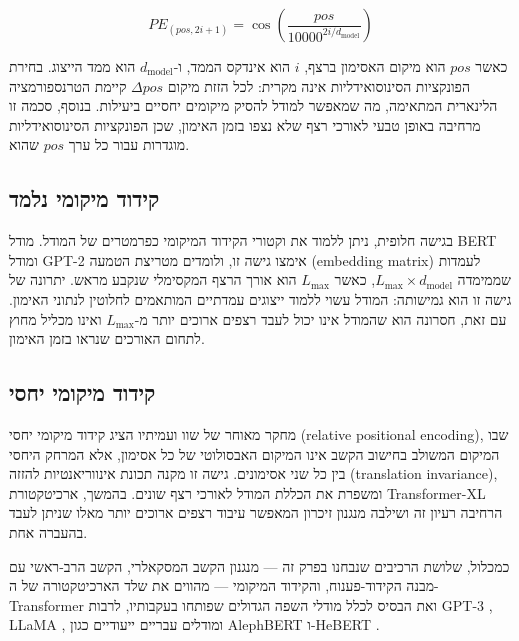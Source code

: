 \begin{equation}
  PE_{(pos, 2i+1)} = \cos\!\left(\frac{pos}{10000^{2i/d_{\text{model}}}}\right)
\end{equation}

כאשר \(pos\) הוא מיקום האסימון ברצף, \(i\) הוא אינדקס
הממד, ו-\(d_{\text{model}}\) הוא ממד הייצוג.
בחירת הפונקציות הסינוסואידליות אינה מקרית: לכל הזזת מיקום
\(\Delta pos\) קיימת הטרנספורמציה הלינארית המתאימה,
מה שמאפשר למודל להסיק מיקומים יחסיים ביעילות.
בנוסף, סכמה זו מרחיבה באופן טבעי לאורכי רצף שלא נצפו
בזמן האימון, שכן הפונקציות הסינוסואידליות מוגדרות עבור
כל ערך \(pos\) שהוא.

\subsection*{קידוד מיקומי נלמד}

בגישה חלופית, ניתן ללמוד את וקטורי הקידוד המיקומי
כפרמטרים של המודל.
מודל \textenglish{BERT} \cite{devlin2019bert} ומודל
\textenglish{GPT-2} \cite{radford2019language} אימצו גישה זו,
ולומדים מטריצת הטמעה (\textenglish{embedding matrix}) לעמדות
שממימדה \(L_{\max} \times d_{\text{model}}\), כאשר
\(L_{\max}\) הוא אורך הרצף המקסימלי שנקבע מראש.
יתרונה של גישה זו הוא גמישותה: המודל עשוי ללמוד ייצוגים
עמדתיים המותאמים לחלוטין לנתוני האימון.
עם זאת, חסרונה הוא שהמודל אינו יכול לעבד רצפים ארוכים
יותר מ-\(L_{\max}\) ואינו מכליל מחוץ לתחום האורכים שנראו
בזמן האימון.

\subsection*{קידוד מיקומי יחסי}

מחקר מאוחר של שוו ועמיתיו \cite{shaw2018relative} הציג
קידוד מיקומי יחסי (\textenglish{relative positional encoding}),
שבו המיקום המשולב בחישוב הקשב אינו המיקום האבסולוטי של
כל אסימון, אלא המרחק היחסי בין כל שני אסימונים.
גישה זו מקנה תכונת אינווריאנטיות להזזה (\textenglish{translation invariance}),
ומשפרת את הכללת המודל לאורכי רצף שונים.
בהמשך, ארכיטקטורת \textenglish{Transformer-XL} \cite{dai2019transformerxl}
הרחיבה רעיון זה ושילבה מנגנון זיכרון המאפשר עיבוד
רצפים ארוכים יותר מאלו שניתן לעבד בהעברה אחת.

כמכלול, שלושת הרכיבים שנבחנו בפרק זה — מנגנון הקשב
המסקאלרי, הקשב הרב-ראשי עם מבנה הקידוד-פענוח,
והקידוד המיקומי — מהווים את שלד הארכיטקטורה של
ה-\textenglish{Transformer} ואת הבסיס לכלל מודלי השפה
הגדולים שפותחו בעקבותיו, לרבות \textenglish{GPT-3}
\cite{brown2020language}, \textenglish{LLaMA} \cite{touvron2023llama},
ומודלים עבריים ייעודיים כגון \textenglish{AlephBERT}
\cite{seker2022alephbert} ו-\textenglish{HeBERT}
\cite{chriqui2022hebert}.

